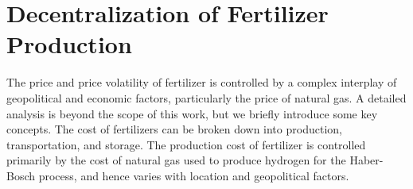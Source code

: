 \section{Decentralization of Fertilizer Production}

The price and price volatility of fertilizer is controlled by a complex interplay of geopolitical and economic factors, particularly the price of natural gas\cite{Huang2007,Etienne2016}. A detailed analysis is beyond the scope of this work, but we briefly introduce some key concepts. The cost of fertilizers can be broken down into production, transportation, and storage. The production cost of fertilizer is controlled primarily by the cost of natural gas used to produce hydrogen for the Haber-Bosch process, and hence varies with location and geopolitical factors. 
